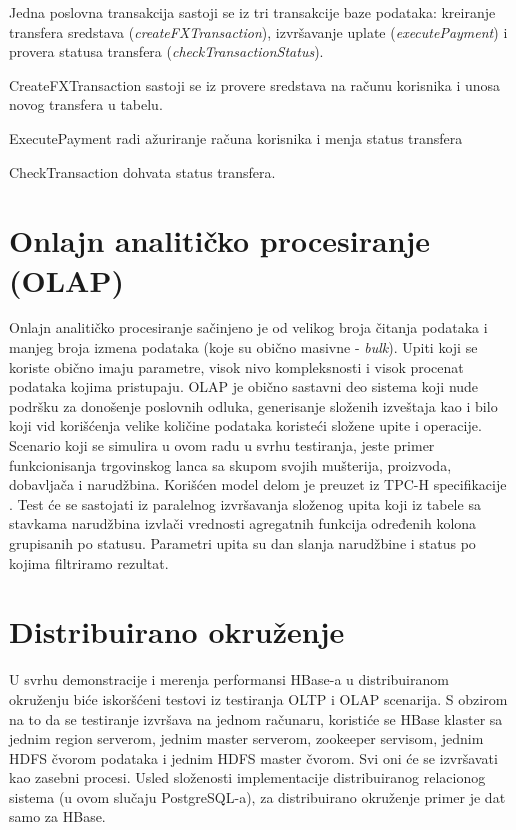 \documentclass[12pt,oneside]{memoir}
\begin{document}
Jedna poslovna transakcija sastoji se iz tri transakcije baze podataka: kreiranje transfera sredstava (\textit{createFXTransaction}), izvršavanje uplate (\textit{executePayment}) i provera statusa transfera (\textit{checkTransactionStatus}).

CreateFXTransaction sastoji se iz provere sredstava na računu korisnika i unosa novog transfera u tabelu.

ExecutePayment radi ažuriranje računa korisnika i menja status transfera

CheckTransaction dohvata status transfera.

\section{Onlajn analitičko procesiranje (OLAP)}

Onlajn analitičko procesiranje sačinjeno je od velikog broja čitanja podataka i manjeg broja izmena podataka (koje su obično masivne - \textit{bulk}). Upiti koji se koriste obično imaju parametre, visok nivo kompleksnosti i visok procenat podataka kojima pristupaju. OLAP je obično sastavni deo sistema koji nude podršku za donošenje poslovnih odluka, generisanje složenih izveštaja kao i bilo koji vid korišćenja velike količine podataka koristeći složene upite i operacije. Scenario koji se simulira u ovom radu u svrhu testiranja, jeste primer funkcionisanja trgovinskog lanca sa skupom svojih mušterija, proizvoda, dobavljača i narudžbina. Korišćen model delom je preuzet iz TPC-H specifikacije \cite{tpch}. Test će se sastojati iz paralelnog izvršavanja složenog upita koji iz tabele sa stavkama narudžbina izvlači vrednosti agregatnih funkcija određenih kolona grupisanih po statusu. Parametri upita su dan slanja narudžbine i status po kojima filtriramo rezultat.


\section{Distribuirano okruženje}

U svrhu demonstracije i merenja performansi HBase-a u distribuiranom okruženju biće iskoršćeni testovi iz testiranja OLTP i OLAP  scenarija. S obzirom na to da se testiranje izvršava na jednom računaru, koristiće se HBase klaster sa jednim region serverom, jednim master serverom, zookeeper servisom,  jednim HDFS čvorom podataka i jednim HDFS master čvorom. Svi oni će se izvršavati kao zasebni procesi. Usled složenosti implementacije distribuiranog relacionog sistema (u ovom slučaju PostgreSQL-a), za distribuirano okruženje primer je dat samo za HBase.
\end{document}
